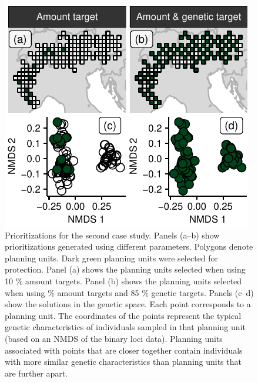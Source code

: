 \begin{figure}
\centering
\includegraphics{figures_files/figure-latex/unnamed-chunk-10-1.pdf}
\caption{Prioritizations for the second case study. Panels (a--b) show
prioritizations generated using different parameters. Polygons denote
planning units. Dark green planning units were selected for protection.
Panel (a) shows the planning units selected when using 10 \% amount
targets. Panel (b) shows the planning units selected when using \%
amount targets and 85 \% genetic targets. Panels (c--d) show the
solutions in the genetic space. Each point corresponds to a planning
unit. The coordinates of the points represent the typical genetic
characteristics of individuals sampled in that planning unit (based on
an NMDS of the binary loci data). Planning units associated with points
that are closer together contain individuals with more similar genetic
characteristics than planning units that are further apart.}
\end{figure}
